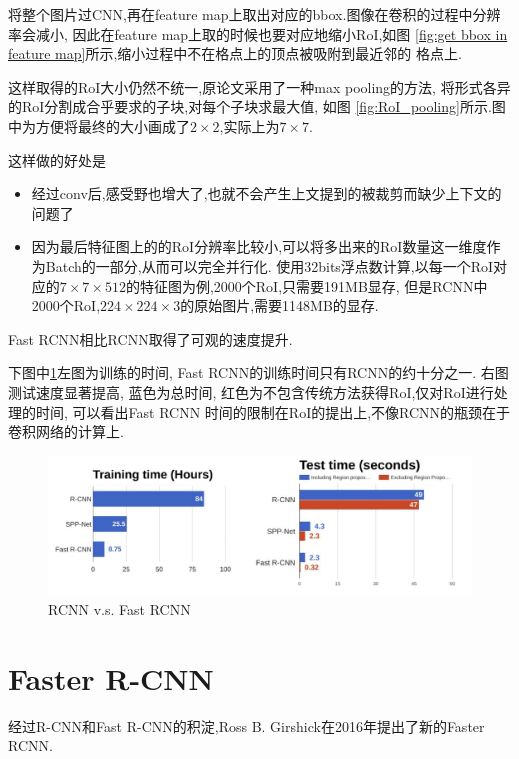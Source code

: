 将整个图片过CNN,再在feature map上取出对应的bbox.图像在卷积的过程中分辨率会减小,
因此在feature map上取的时候也要对应地缩小RoI,如图
\ref{fig:get bbox in feature map}所示,缩小过程中不在格点上的顶点被吸附到最近邻的
格点上.

这样取得的RoI大小仍然不统一,原论文采用了一种max pooling的方法,
将形式各异的RoI分割成合乎要求的子块,对每个子块求最大值,
如图 \ref{fig:RoI_pooling}所示.图中为方便将最终的大小画成了$2\times 2$,实际上为$7\times 7$.

这样做的好处是

\begin{itemize}
    \item 经过conv后,感受野也增大了,也就不会产生上文提到的被裁剪而缺少上下文的问题了
    \item 因为最后特征图上的的RoI分辨率比较小,可以将多出来的RoI数量这一维度作为Batch的一部分,从而可以完全并行化.
    使用32bits浮点数计算,以每一个RoI对应的$7\times 7\times 512$的特征图为例,2000个RoI,只需要191MB显存,
    但是RCNN中2000个RoI,$224\times 224\times 3$的原始图片,需要1148MB的显存.
\end{itemize}

Fast RCNN相比RCNN取得了可观的速度提升.

下图中\ref{fig:rcnn_vs_frcnn}左图为训练的时间,
Fast RCNN的训练时间只有RCNN的约十分之一.
右图测试速度显著提高, 蓝色为总时间,
红色为不包含传统方法获得RoI,仅对RoI进行处理的时间,
可以看出Fast RCNN
时间的限制在RoI的提出上,不像RCNN的瓶颈在于卷积网络的计算上.

\begin{figure}[htbp]
    \centering
    \includegraphics[scale=0.65]{figures/rcnn_vs_frcnn.png}
    \caption{RCNN v.s. Fast RCNN}
    \label{fig:rcnn_vs_frcnn}
\end{figure}

\section{Faster R-CNN}

经过R-CNN和Fast R-CNN的积淀,Ross B. Girshick在2016年提出了新的Faster RCNN.

